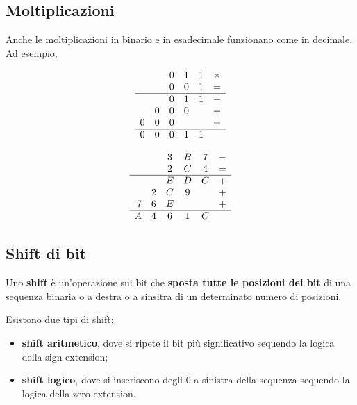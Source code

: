 \documentclass[11pt, a4paper, titlepage, oneside]{scrbook}
\begin{document}
\subsection{Moltiplicazioni}

Anche le moltiplicazioni in binario e in esadecimale funzionano come in decimale. Ad esempio,

\noindent
\begin{minipage}{0.48\textwidth}
\[
\begin{array}{rccccc}
& & 0 & 1 & 1 & \times \\
& & 0 & 0 & 1 & = \\
\hline
& & 0 & 1 & 1 & + \\
& 0 & 0 & 0 & & + \\
0 & 0 & 0 & & & + \\
\hline
0 & 0 & 0 & 1 & 1
\end{array}
\]
\end{minipage}\hfill
\begin{minipage}{0.48\textwidth}
\[
\begin{array}{rccccc}
& & 3 & B & 7 & - \\
& & 2 & C & 4 & = \\
\hline
& & E & D & C & + \\
& 2 & C & 9 & & + \\
7 & 6 & E & & & + \\
\hline
A & 4 & 6 & 1 & C
\end{array}
\]
\end{minipage}

\subsection{Shift di bit}

\begin{Definizione}[Shift]
\label{def-shift}
Uno \textbf{shift} è un'operazione sui bit che \textbf{sposta tutte le posizioni dei bit} di una sequenza binaria o a destra o a sinsitra di un determinato numero di posizioni.
\end{Definizione} 

Esistono due tipi di shift:
\begin{itemize}
    \item \textbf{shift aritmetico}, dove si ripete il bit più significativo sequendo la logica della sign-extension;
    \item \textbf{shift logico}, dove si inseriscono degli 0 a sinistra della sequenza sequendo la logica della zero-extension.
\end{itemize}
\end{document}
